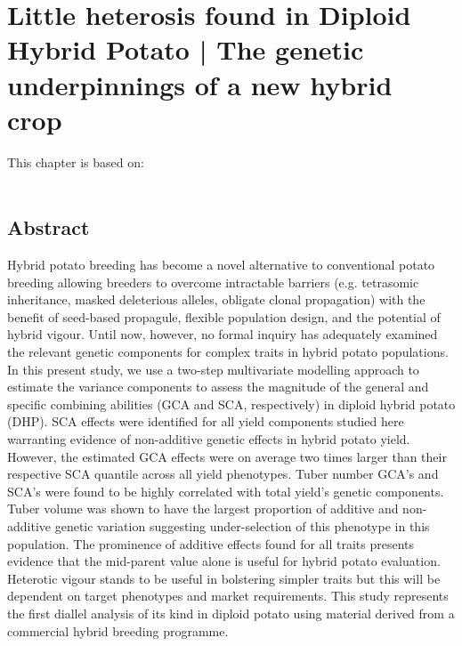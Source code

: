 \chapter[Little heterosis found in Diploid Hybrid Potato | The genetic underpinnings of a new hybrid crop]{Little heterosis found in Diploid Hybrid Potato | The genetic underpinnings of a new hybrid crop}
\label{cha:chapter2}
\vspace*{\fill}
This chapter is based on:
\\
\\
\newpage

\section*{Abstract}
 Hybrid potato breeding has become a novel alternative to conventional potato breeding allowing breeders to overcome intractable barriers (e.g. tetrasomic inheritance, masked deleterious alleles, obligate clonal propagation) with the benefit of seed-based propagule, flexible population design, and the potential of hybrid vigour. Until now, however, no formal inquiry has adequately examined the relevant genetic components for complex traits in hybrid potato populations. In this present study, we use a two-step multivariate modelling approach to estimate the variance components to assess the magnitude of the general and specific combining abilities (GCA and SCA, respectively) in diploid hybrid potato (DHP). SCA effects were identified for all yield components studied here warranting evidence of non-additive genetic effects in hybrid potato yield. However, the estimated GCA effects were on average two times larger than their respective SCA quantile across all yield phenotypes. Tuber number GCA’s and SCA’s were found to be highly correlated with total yield's genetic components. Tuber volume was shown to have the largest proportion of additive and non-additive genetic variation suggesting under-selection of this phenotype in this population. The prominence of additive effects found for all traits presents evidence that the mid-parent value alone is useful for hybrid potato evaluation. Heterotic vigour stands to be useful in bolstering simpler traits but this will be dependent on target phenotypes and market requirements. This study represents the first diallel analysis of its kind in diploid potato using material derived from a commercial hybrid breeding programme.

